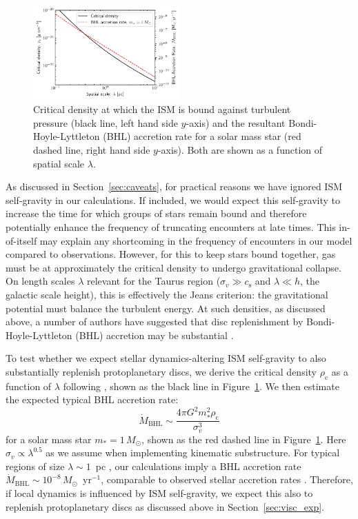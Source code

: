\documentclass{aa}
\begin{document}
\begin{figure}
    \centering
    \includegraphics[width=0.5\textwidth]{Figures/rhocrit_BHL.pdf}
    \caption{Critical density at which the ISM is bound against turbulent pressure (black line, left hand side $y$-axis) and the resultant Bondi-Hoyle-Lyttleton (BHL) accretion rate for a solar mass star (red dashed line, right hand side $y$-axis). Both are shown as a function of spatial scale $\lambda$.  }
    \label{fig:BHL_rate}
\end{figure}

{As discussed in Section~\ref{sec:caveats}, for practical reasons we have ignored ISM self-gravity in our calculations. If included, we would expect this self-gravity to increase the time for which groups of stars remain bound and therefore potentially enhance the frequency of truncating encounters at late times. This in-of-itself may explain any shortcoming in the frequency of encounters in our model compared to observations. However, for this to keep stars bound together, gas must be at approximately the critical density to undergo gravitational collapse. On length scales $\lambda$ relevant for the Taurus region ($\sigma_v\gg c_\mathrm{s}$ and $\lambda\ll h$, the galactic scale height), this is effectively the Jeans criterion: the gravitational potential must balance the turbulent energy. At such densities, as discussed above, a number of authors have suggested that disc replenishment by Bondi-Hoyle-Lyttleton (BHL) accretion may be substantial \citep[][]{Padoan05,Throop08, Kuffmeier23, Winter24}.}

{To test whether we expect stellar dynamics-altering ISM self-gravity to also substantially replenish protoplanetary discs, we derive the critical density $\rho_\mathrm{c}$ as a function of $\lambda$ following \citet{Winter24}, shown as the black line in Figure~\ref{fig:BHL_rate}. We then estimate the expected typical BHL accretion rate:}
\begin{equation}
    \dot{M}_\mathrm{BHL} \sim \frac{4 \pi G^2 m_*^2 \rho_\mathrm{c}}{\sigma_v^3}
\end{equation}{for a solar mass star $m_*=1\, M_\odot$, shown as the red dashed line in Figure~\ref{fig:BHL_rate}. Here $\sigma_v \propto \lambda^{0.5}$ as we assume when implementing kinematic substructure. For typical regions of size $\lambda \sim 1$~pc \citep{Schmalzl10, Joncour18}, our calculations imply a BHL accretion rate $\dot{M}_\mathrm{BHL} \sim 10^{-8} \, M_\odot$~yr$^{-1}$, comparable to observed stellar accretion rates \citep[e.g.][]{Manara23}. Therefore, if local dynamics is influenced by ISM self-gravity, we expect this also to replenish protoplanetary discs as discussed above in Section~\ref{sec:visc_exp}.} 
\end{document}
